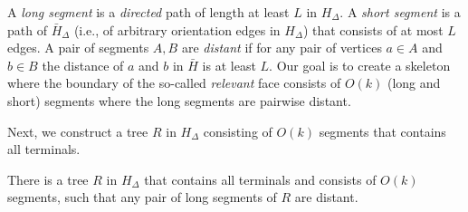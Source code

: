 A \emph{long segment} is a \emph{directed} path of length at least $L$ in $H_\Delta$. A \emph{short segment} is a path of $\bar{H}_\Delta$ (i.e., of arbitrary orientation edges in $H_\Delta$) that consists of at most $L$ edges. A pair of segments $A,B$ are \emph{distant} if for any pair of vertices $a\in A$ and $b\in B$ the distance of $a$ and $b$ in $\bar{H}$ is at least $L$. Our goal is to create a skeleton where the boundary of the so-called \emph{relevant} face consists of $O(k)$ (long and short) segments where the long segments are pairwise distant.

Next, we construct a tree $R$ in $H_\Delta$ consisting of $O(k)$ segments that contains all terminals.

\begin{lemma}\label{lem:maketree}
There is a tree $R$ in $H_\Delta$ that contains all terminals and consists of $O(k)$ segments, such that any pair of long segments of $R$ are distant.
\end{lemma}

